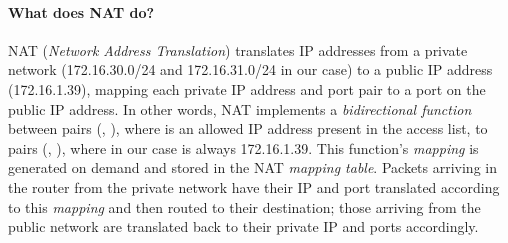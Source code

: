 \documentclass[compilation.tex]{subfiles}
\begin{document}
	\paragraph{What does NAT do?}
	NAT (\textsl{Network Address Translation}) translates IP addresses from a private network (172.16.30.0/24 and 172.16.31.0/24 in our case) to a public IP address (172.16.1.39), mapping each private IP address and port pair to a port on the public IP address. In other words, NAT implements a \textsl{bidirectional function} between pairs (, ), where  is an allowed IP address present in the access list, to pairs (, ), where  in our case is always 172.16.1.39. This function's \textsl{mapping} is generated on demand and stored in the NAT \textsl{mapping table}. Packets arriving in the router from the private network have their IP and port translated according to this \textsl{mapping} and then routed to their destination; those arriving from the public network are translated back to their private IP and ports accordingly.
	
\end{document}
